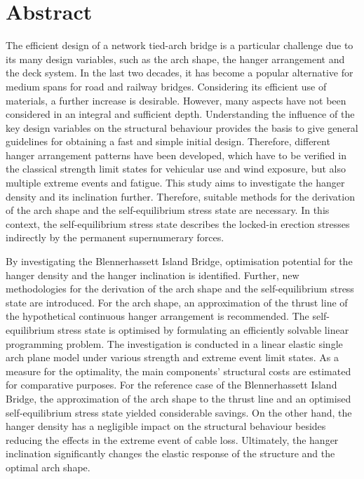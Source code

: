 \chapter*{Abstract}
The efficient design of a network tied-arch bridge is a particular challenge due to its many design variables, such as the arch shape, the hanger arrangement and the deck system. In the last two decades, it has become a popular alternative for medium spans for road and railway bridges. Considering its efficient use of materials, a further increase is desirable. However, many aspects have not been considered in an integral and sufficient depth. Understanding the influence of the key design variables on the structural behaviour provides the basis to give general guidelines for obtaining a fast and simple initial design. 
Therefore, different hanger arrangement patterns have been developed, which have to be verified in the classical strength limit states for vehicular use and wind exposure, but also multiple extreme events and fatigue. This study aims to investigate the hanger density and its inclination further. Therefore, suitable methods for the derivation of the arch shape and the self-equilibrium stress state are necessary. In this context, the self-equilibrium stress state describes the locked-in erection stresses indirectly by the permanent supernumerary forces.\medskip

By investigating the Blennerhassett Island Bridge, optimisation potential for the hanger density and the hanger inclination is identified. Further, new methodologies for the derivation of the arch shape and the self-equilibrium stress state are introduced. For the arch shape, an approximation of the thrust line of the hypothetical continuous hanger arrangement is recommended. The self-equilibrium stress state is optimised by formulating an efficiently solvable linear programming problem. The investigation is conducted in a linear elastic single arch plane model under various strength and extreme event limit states. As a measure for the optimality, the main components' structural costs are estimated for comparative purposes. For the reference case of the Blennerhassett Island Bridge, the approximation of the arch shape to the thrust line and an optimised self-equilibrium stress state yielded considerable savings. On the other hand, the hanger density has a negligible impact on the structural behaviour besides reducing the effects in the extreme event of cable loss. Ultimately, the hanger inclination significantly changes the elastic response of the structure and the optimal arch shape.\medskip

